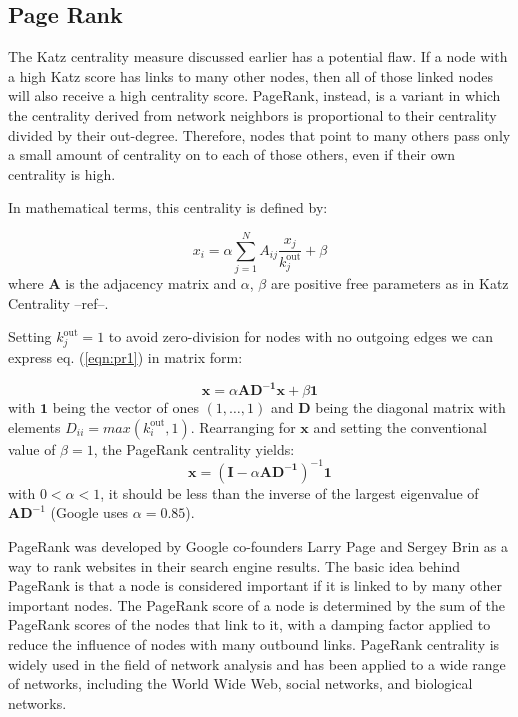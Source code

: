 \subsection*{Page Rank}

The Katz centrality measure discussed earlier has a potential flaw. If a node with a high Katz score has links to many other nodes, then all of those linked nodes will also receive a high centrality score. PageRank, instead, is a variant in which the centrality derived from network neighbors is proportional to their centrality divided by their out-degree. Therefore, nodes that point to many others pass only a small amount of centrality on to each of those others, even if their own centrality is high.

In mathematical terms, this centrality is defined by:

\begin{equation}
\label{eqn:pr1}
    x_i= \alpha\sum_{j=1}^{N}A_{ij}\frac{x_j}{k_j^{\text{out}}} + \beta
\end{equation}
where $\mathbf{A}$ is the adjacency matrix and $\alpha$, $\beta$ are positive free parameters as in Katz Centrality --ref--.

Setting $k_j^{\text{out}}=1$ to avoid zero-division for nodes with no outgoing edges we can express eq. (\ref{eqn:pr1}) in matrix form:

\begin{equation}
\label{eqn:pr2}
    \mathbf{x} = \alpha\mathbf{AD^{-1}x} + \beta \mathbf{1}
\end{equation}
with $\mathbf{1}$ being the vector of ones $(1,\dots,1)$ and $\mathbf{D}$ being the diagonal matrix with elements $D_{ii} = max(k_i^{\text{out}},1)$. Rearranging for $\mathbf{x}$ and setting the conventional value of $\beta=1$, the PageRank centrality yields:
\begin{equation}
\label{eqn:pr3}
    \mathbf{x} = (\mathbf{I} - \alpha\mathbf{AD^{-1}})^{-1} \mathbf{1}
\end{equation}
with $0<\alpha<1$, it should be less than the inverse of the largest eigenvalue of $\mathbf{AD}^{-1}$ (Google uses $\alpha = 0.85$).


PageRank was developed by Google co-founders Larry Page and Sergey Brin as a way to rank websites in their search engine results. The basic idea behind PageRank is that a node is considered important if it is linked to by many other important nodes. The PageRank score of a node is determined by the sum of the PageRank scores of the nodes that link to it, with a damping factor applied to reduce the influence of nodes with many outbound links. PageRank centrality is widely used in the field of network analysis and has been applied to a wide range of networks, including the World Wide Web, social networks, and biological networks.


